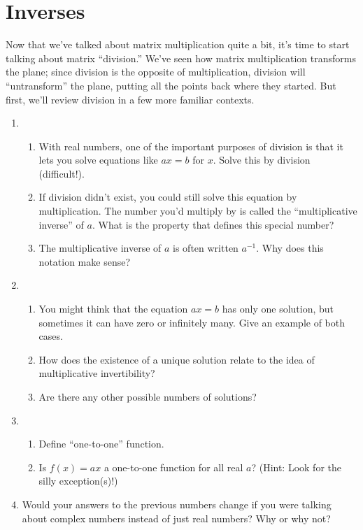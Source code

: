 \documentclass[../gatm.tex]{subfiles}
\begin{document}
\section{Inverses}
\setcounter{problem_i}{0}

Now that we've talked about matrix multiplication quite a bit, it's time to start talking about matrix ``division.'' We've seen how matrix multiplication transforms the plane; since division is the opposite of multiplication, division will ``untransform'' the plane, putting all the points back where they started. But first, we'll review division in a few more familiar contexts.

\begin{enumerate}
\setcounter{enumi}{\value{problem_i}}
\item \begin{enumerate}
\item With real numbers, one of the important purposes of division is that it lets you solve equations like $ax=b$ for $x$. Solve this by division (difficult!).
\item If division didn't exist, you could still solve this equation by multiplication. The number you'd multiply by is called the ``multiplicative inverse'' of $a$. What is the property that defines this special number?
\item The multiplicative inverse of $a$ is often written $a^{-1}$. Why does this notation make sense?
\end{enumerate}
\item \begin{enumerate}
\item You might think that the equation $ax=b$ has only one solution, but sometimes it can have zero or infinitely many. Give an example of both cases.
\item How does the existence of a unique solution relate to the idea of multiplicative invertibility?
\item Are there any other possible numbers of solutions?
\end{enumerate}
\item \begin{enumerate}
\item Define ``one-to-one'' function.
\item Is $f(x)=ax$ a one-to-one function for all real $a$? (Hint: Look for the silly exception(s)!)
\end{enumerate}
\item Would your answers to the previous numbers change if you were talking about complex numbers instead of just real numbers? Why or why not?
\setcounter{problem_i}{\value{enumi}}
\end{enumerate}
\end{document}
